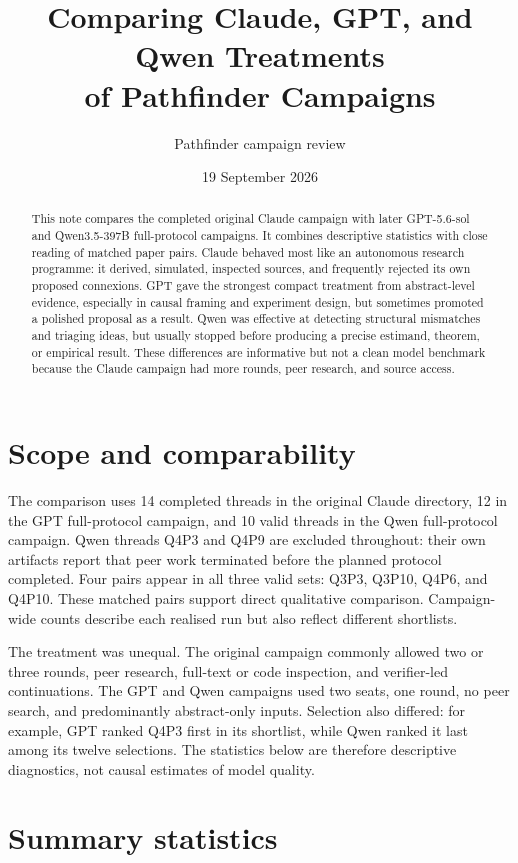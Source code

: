 \documentclass[11pt,a4paper]{article}
\title{Comparing Claude, GPT, and Qwen Treatments\\of Pathfinder Campaigns}
\author{Pathfinder campaign review}
\date{19 September 2026}
\begin{document}
\maketitle

\begin{abstract}
This note compares the completed original Claude campaign with later
GPT-5.6-sol and Qwen3.5-397B full-protocol campaigns.  It combines descriptive
statistics with close reading of matched paper pairs.  Claude behaved most
like an autonomous research programme: it derived, simulated, inspected
sources, and frequently rejected its own proposed connexions.  GPT gave the
strongest compact treatment from abstract-level evidence, especially in
causal framing and experiment design, but sometimes promoted a polished
proposal as a result.  Qwen was effective at detecting structural mismatches
and triaging ideas, but usually stopped before producing a precise estimand,
theorem, or empirical result.  These differences are informative but not a
clean model benchmark because the Claude campaign had more rounds, peer
research, and source access.
\end{abstract}

\section{Scope and comparability}

The comparison uses 14 completed threads in the original Claude directory,
12 in the GPT full-protocol campaign, and 10 valid threads in the Qwen
full-protocol campaign.  Qwen threads Q4P3 and Q4P9 are excluded throughout:
their own artifacts report that peer work terminated before the planned
protocol completed.  Four pairs appear in all three valid sets: Q3P3, Q3P10,
Q4P6, and Q4P10.  These matched pairs support direct qualitative
comparison.  Campaign-wide counts describe each realised run but also reflect
different shortlists.

The treatment was unequal.  The original campaign commonly allowed two or
three rounds, peer research, full-text or code inspection, and verifier-led
continuations.  The GPT and Qwen campaigns used two seats, one round, no peer
search, and predominantly abstract-only inputs.  Selection also differed:
for example, GPT ranked Q4P3 first in its shortlist, while Qwen ranked it last
among its twelve selections.  The statistics below are therefore descriptive
diagnostics, not causal estimates of model quality.

\section{Summary statistics}
\end{document}
